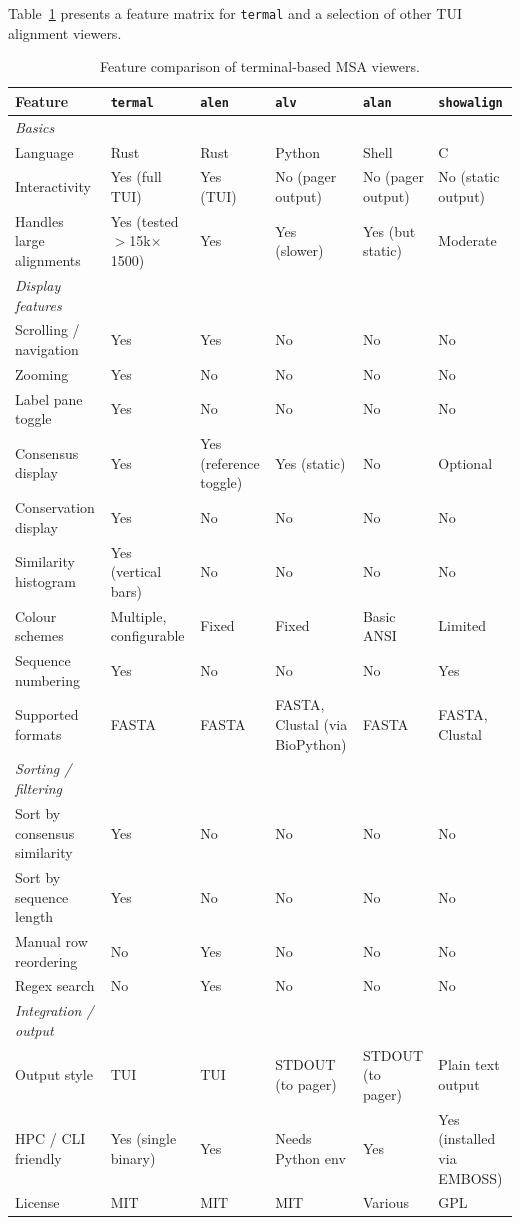 \documentclass[11pt]{article}
\begin{document}
Table~\ref{tbl:comparison} presents a feature matrix for \texttt{termal} and a
selection of other TUI alignment viewers.

\begin{landscape}
\begin{table}[ht]
\centering
\small
\begin{tabularx}{\linewidth}{lXXXXX}
\toprule
\textbf{Feature} & \textbf{\texttt{termal}} & \textbf{\texttt{alen}} & \textbf{\texttt{alv}} & \textbf{\texttt{alan}} & \textbf{\texttt{showalign}} \\
\midrule
\textit{Basics} \\
Language & Rust & Rust & Python & Shell & C \\
Interactivity & Yes (full TUI) & Yes (TUI) & No (pager output) & No (pager output) & No (static output) \\
Handles large alignments & Yes (tested $>$15k$\times$1500) & Yes & Yes (slower) & Yes (but static) & Moderate \\
\midrule
\textit{Display features} \\
Scrolling / navigation & Yes & Yes & No & No & No \\
Zooming & Yes & No & No & No & No \\
Label pane toggle & Yes & No & No & No & No \\
Consensus display & Yes & Yes (reference toggle) & Yes (static) & No & Optional \\
Conservation display & Yes & No & No & No & No \\
Similarity histogram & Yes (vertical bars) & No & No & No & No \\
Colour schemes & Multiple, configurable & Fixed & Fixed & Basic ANSI & Limited \\
Sequence numbering & Yes & No & No & No & Yes \\
Supported formats & FASTA & FASTA & FASTA, Clustal (via BioPython) & FASTA & FASTA, Clustal \\
\midrule
\textit{Sorting / filtering} \\
Sort by consensus similarity & Yes & No & No & No & No \\
Sort by sequence length & Yes & No & No & No & No \\
Manual row reordering & No & Yes & No & No & No \\
Regex search & No & Yes & No & No & No \\
\midrule
\textit{Integration / output} \\
Output style & TUI & TUI & STDOUT (to pager) & STDOUT (to pager) & Plain text output \\
HPC / CLI friendly & Yes (single binary) & Yes & Needs Python env & Yes & Yes (installed via EMBOSS) \\
	License & MIT & MIT & MIT & Various & GPL \\
\bottomrule
\end{tabularx}
\caption{Feature comparison of terminal-based MSA viewers.}
\label{tbl:comparison}
\end{table}
\end{landscape}
\end{document}

